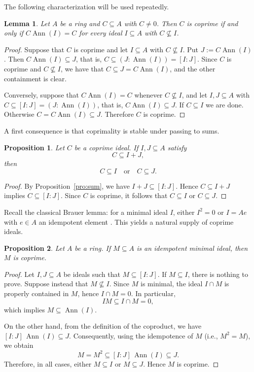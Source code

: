 \documentclass{amsart}
\newtheorem{lemma}{Lemma}
\newtheorem{proposition}{Proposition}
\DeclareMathOperator{\ann}{Ann}
\begin{document}
The following characterization will be used repeatedly.

\begin{lemma}\label{lem:coprime-characterization}
Let $A$ be a ring and $C\subseteq A$ with $C\neq 0$. Then $C$ is coprime if and only if $C\ann(I)=C$ for every ideal $I\subseteq A$ with $C\not\subseteq I$.
\end{lemma}

\begin{proof}
Suppose that $C$ is coprime and let $I\subseteq A$ with $C\not\subseteq I$. Put $J:=C\ann(I)$. Then $C\ann(I)\subseteq J$, that is, $C\subseteq(J:\ann(I))=[I:J]$. Since $C$ is coprime and $C\not\subseteq I$, we have that $C\subseteq J=C\ann(I)$, and the other containment is clear.

Conversely, suppose that $C\ann(I)=C$ whenever $C\not\subseteq I$, and let $I,J\subseteq A$ with $C\subseteq[I:J]=(J:\ann(I))$, that is, $C\ann(I)\subseteq J$. If $C\subseteq I$ we are done. Otherwise $C=C\ann(I)\subseteq J$. Therefore $C$ is coprime.
\end{proof}

A first consequence is that coprimality is stable under passing to sums.

\begin{proposition}\label{prop:coprime-sum}
Let $C$ be a coprime ideal. If $I,J\subseteq A$ satisfy
\[
C \subseteq I+J,
\]
then
\[
C \subseteq I \quad \text{or} \quad C \subseteq J.
\]
\end{proposition}

\begin{proof}
By Proposition~\ref{pro:sum}, we have $I+J \subseteq [I:J]$. Hence $C\subseteq I+J$ implies $C\subseteq [I:J]$. Since $C$ is coprime, it follows that $C\subseteq I$ or $C\subseteq J$.
\end{proof}

Recall the classical Brauer lemma: for a minimal ideal $I$, either $I^2=0$ or $I=Ae$ with $e\in A$ an idempotent element \cite{lam1991first}. This yields a natural supply of coprime ideals.

\begin{proposition}\label{prop:minimal-idempotent-coprime}
Let $A$ be a ring. If $M\subseteq A$ is an idempotent minimal ideal, then $M$ is coprime.
\end{proposition}

\begin{proof}
Let $I,J\subseteq A$ be ideals such that $M\subseteq [I:J]$. If $M\subseteq I$, there is nothing to prove. Suppose instead that $M\not\subseteq I$. Since $M$ is minimal, the ideal $I\cap M$ is properly contained in $M$, hence $I\cap M=0$. In particular,
\[
IM \subseteq I\cap M = 0,
\]
which implies $M\subseteq \ann(I)$.

On the other hand, from the definition of the coproduct, we have $[I:J]\,\ann(I)\subseteq J$. Consequently, using the idempotence of $M$ (i.e., $M^2=M$), we obtain
\[
M = M^2 \subseteq [I:J]\,\ann(I) \subseteq J.
\]
Therefore, in all cases, either $M\subseteq I$ or $M\subseteq J$. Hence $M$ is coprime.
\end{proof}
\end{document}
